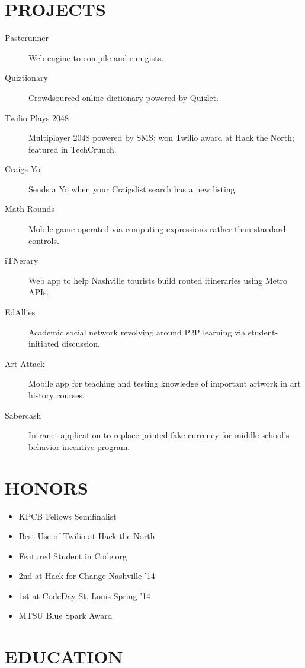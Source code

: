 \documentclass{res}
\begin{document}
\section{PROJECTS}

\begin{description}
  \item[Pasterunner] Web engine to compile and run gists.
  \item[Quiztionary] Crowdsourced online dictionary powered by Quizlet.
  \item[Twilio Plays 2048] Multiplayer 2048 powered by SMS; won Twilio award at Hack the North; featured in TechCrunch.
  \item[Craigs Yo] Sends a Yo when your Craigslist search has a new listing.
  \item[Math Rounds] Mobile game operated via computing expressions rather than standard controls.
  \item[iTNerary] Web app to help Nashville tourists build routed itineraries using Metro APIs.
  \item[EdAllies] Academic social network revolving around P2P learning via student-initiated discussion.
  \item[Art Attack] Mobile app for teaching and testing knowledge of important artwork in art history courses.
  \item[Sabercash] Intranet application to replace printed fake currency for middle school's behavior incentive program.
\end{description}

\section{HONORS}

\begin{itemize}
  \item KPCB Fellows Semifinalist
  \item Best Use of Twilio at Hack the North
  \item Featured Student in Code.org
  \item 2nd at Hack for Change Nashville '14
  \item 1st at CodeDay St. Louis Spring '14
  \item MTSU Blue Spark Award
\end{itemize}

\section{EDUCATION}
\end{document}
